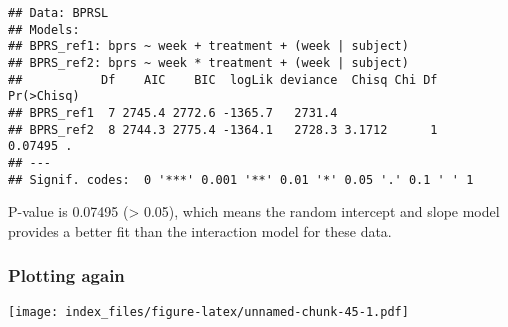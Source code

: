 \documentclass[]{article}
\newenvironment{Shaded}{\begin{snugshade}}{\end{snugshade}}
\newcommand{\KeywordTok}[1]{\textcolor[rgb]{0.13,0.29,0.53}{\textbf{#1}}}
\newcommand{\DataTypeTok}[1]{\textcolor[rgb]{0.13,0.29,0.53}{#1}}
\newcommand{\DecValTok}[1]{\textcolor[rgb]{0.00,0.00,0.81}{#1}}
\newcommand{\StringTok}[1]{\textcolor[rgb]{0.31,0.60,0.02}{#1}}
\newcommand{\CommentTok}[1]{\textcolor[rgb]{0.56,0.35,0.01}{\textit{#1}}}
\newcommand{\OperatorTok}[1]{\textcolor[rgb]{0.81,0.36,0.00}{\textbf{#1}}}
\newcommand{\NormalTok}[1]{#1}
\begin{document}
\begin{verbatim}
## Data: BPRSL
## Models:
## BPRS_ref1: bprs ~ week + treatment + (week | subject)
## BPRS_ref2: bprs ~ week * treatment + (week | subject)
##           Df    AIC    BIC  logLik deviance  Chisq Chi Df Pr(>Chisq)  
## BPRS_ref1  7 2745.4 2772.6 -1365.7   2731.4                           
## BPRS_ref2  8 2744.3 2775.4 -1364.1   2728.3 3.1712      1    0.07495 .
## ---
## Signif. codes:  0 '***' 0.001 '**' 0.01 '*' 0.05 '.' 0.1 ' ' 1
\end{verbatim}

P-value is 0.07495 (\textgreater{} 0.05), which means the random
intercept and slope model provides a better fit than the interaction
model for these data.

\subsubsection{Plotting again}\label{plotting-again}

\begin{Shaded}
\end{Shaded}

\texttt{[image: index\_files/figure-latex/unnamed-chunk-45-1.pdf]}
\end{document}
